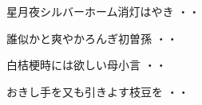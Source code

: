 \begin{shiika}星月夜シルバーホーム消灯はやき
\hfill{・・}\end{shiika}

\begin{shiika}誰似かと爽やかろんぎ初曽孫
\hfill{・・}\end{shiika}

\begin{shiika}白桔梗時には欲しい母小言
\hfill{・・}\end{shiika}

\begin{shiika}おきし手を又も引きよす枝豆を
\hfill{・・}\end{shiika}
